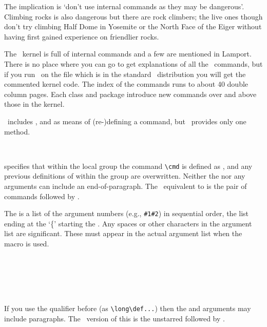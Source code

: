     The implication is `don't use internal commands as they may be dangerous'.
Climbing rocks is also dangerous but there are rock climbers; the live ones
though don't try climbing Half Dome in Yosemite or the North Face of the
Eiger without having first gained experience on friendlier rocks.

The \ltx\ kernel is full of internal commands and a few are mentioned
in Lamport. There is no place where you can go to get explanations of all
the \ltx\ commands, but if you run \ltx\ on the  
file which is in the standard \ltx\ distribution you will get the commented
kernel code. The index of the commands runs to about 40 double column pages.
Each class and package introduce new commands over and above those in the
kernel. 


\ltx\ includes \cmd{\newcommand}, \cmd{\providecommand} and 
\cmd{\renewcommand} as means of (re-)defining a command, but \tx\ 
provides only one method.
\begin{syntax}
\cmd{\def} \\
\end{syntax}
\cmd{\def} specifies that within the local group
the command \verb?\cmd? is defined as , and any previous definitions
of \meta{cmd} within the group are overwritten. Neither the 
\meta{text} nor any arguments can include an end-of-paragraph.
The \ltx\ equivalent to \cmd{\def} is the pair of commands
\cmd{\providecommand*} followed by \cmd{\renewcommand*}.

    The  is a list of the argument numbers 
(e.g., \verb?#1#2?)
 in sequential
order, the list ending at the `\{' starting the . Any
spaces or other characters in the argument list are significant. These
must appear in the actual argument list when the macro is used.

\begin{syntax}
\cmd{\long} \cmd{\global} \\
\cmd{\gdef} \\
\cmd{\edef} \\
\cmd{\xdef}\meta{cmd}\meta{arg-spec}\marg{text} \\
\end{syntax}
If you use the \cmd{\long} qualifier before \cmd{\def} (as \verb?\long\def...?)
then the \meta{text} and arguments may include paragraphs.
The \ltx\ version of this is the unstarred \cmd{\providecommand}
followed by \cmd{\renewcommand}.

